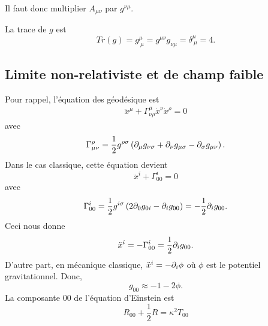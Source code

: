 \documentclass[a4paper,11pt]{report}
\begin{document}
            Il faut donc multiplier $A_{\mu\nu}$ par $g^{\nu\mu}$.
            
            \begin{exmp}
                La trace de $g$ est
                \begin{equation}
                    Tr(g) = g^\mu_{~\mu} = g^{\mu\nu}g_{\nu\mu} = \delta^\mu_{~\mu} = 4.
                \end{equation}
            \end{exmp}
            
            
        \subsection{Limite non-relativiste et de champ faible}
        
            Pour rappel, l'équation des géodésique est 
            \begin{align}
                \ddot{x}^\mu + \Gamma^\mu_{\nu\rho}\dot{x}^\nu\dot{x}^\rho = 0
            \end{align}
            avec
            \begin{equation}
                \Gamma^\rho_{\mu\nu} = \frac{1}{2}g^{\rho\sigma}\left( \partial_\mu g_{\nu\sigma}+\partial_\nu g_{\mu\sigma}-\partial_\sigma g_{\mu\nu} \right).
            \end{equation}
            Dans le cas classique, cette équation devient
            \begin{equation}
                \ddot{x}^i + \Gamma^i_{00} = 0
            \end{equation}
            avec
            \begin{equation}
                \Gamma^i_{00} = \frac{1}{2}g^{i\sigma}\left( 2\partial_0 g_{0i}-\partial_i g_{00} \right) = -\frac{1}{2}\partial_i g_{00}.
            \end{equation}
            Ceci nous donne
            \begin{equation}
                \ddot{x}^i = -\Gamma^i_{00} = \frac{1}{2}\partial_i g_{00}.
            \end{equation}
            D'autre part, en mécanique classique, $\ddot{x}^i = -\partial_i\phi$ où $\phi$ est le potentiel gravitationnel. Donc,
            \begin{equation}
                g_{00}\approx -1-2\phi.
            \end{equation}
            La composante $00$ de l'équation d'Einstein est
            \begin{equation}
                R_{00}+\frac{1}{2}R = \kappa^2 T_{00}
            \end{equation}
\end{document}
